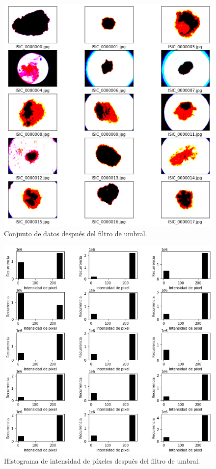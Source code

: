 \begin{figure}[]
    \centering
    \includegraphics[scale=0.7]{../Plots/Images_output.png}
    \caption{Conjunto de datos después del filtro de umbral.}
    \label{fig:img_out}    
\end{figure}

\begin{figure}[]
    \centering
    \includegraphics[scale=0.65]{../Plots/threshold_output.png}
    \caption{Histograma de intensidad de píxeles después del filtro de umbral.}
    \label{fig:hist_out}    
\end{figure}

